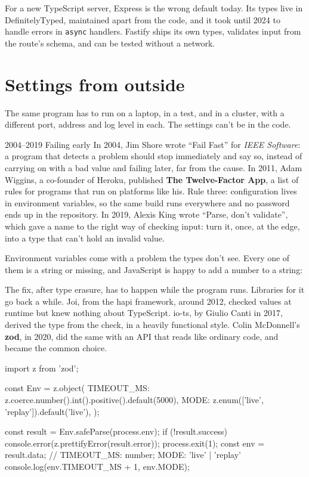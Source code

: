 For a new TypeScript server, Express is the wrong default today. Its types live
in DefinitelyTyped, maintained apart from the code, and it took until 2024 to
handle errors in \texttt{async} handlers. Fastify ships its own types, validates
input from the route's schema, and can be tested without a network.

\section{Settings from outside}

The same program has to run on a laptop, in a test, and in a cluster, with a
different port, address and log level in each. The settings can't be in the
code.

\begin{history}{2004--2019 \textperiodcentered{} Failing early}
In 2004, Jim Shore wrote ``Fail Fast'' for \emph{IEEE Software}: a program that
detects a problem should stop immediately and say so, instead of carrying on
with a bad value and failing later, far from the cause. In 2011, Adam Wiggins,
a co-founder of Heroku, published \textbf{The Twelve-Factor App}, a list of
rules for programs that run on platforms like his. Rule three: configuration
lives in environment variables, so the same build runs everywhere and no
password ends up in the repository. In 2019, Alexis King wrote ``Parse, don't
validate'', which gave a name to the right way of checking input: turn it, once,
at the edge, into a type that can't hold an invalid value.
\end{history}

Environment variables come with a problem the types don't see. Every one of
them is a string or missing, and JavaScript is happy to add a number to a string:


The fix, after type erasure, has to happen while the program runs. Libraries
for it go back a while. Joi, from the hapi framework, around 2012, checked
values at runtime but knew nothing about TypeScript. io-ts, by Giulio Canti in
2017, derived the type from the check, in a heavily functional style. Colin
McDonnell's \textbf{zod}, in 2020, did the same with an API that reads like
ordinary code, and became the common choice.

\begin{code}
import { z } from 'zod';

const Env = z.object({
  TIMEOUT_MS: z.coerce.number().int().positive().default(5000),
  MODE: z.enum(['live', 'replay']).default('live'),
});

const result = Env.safeParse(process.env);
if (!result.success) {
  console.error(z.prettifyError(result.error));
  process.exit(1);
}
const env = result.data; // { TIMEOUT_MS: number; MODE: 'live' | 'replay' }
console.log(env.TIMEOUT_MS + 1, env.MODE);
\end{code}

